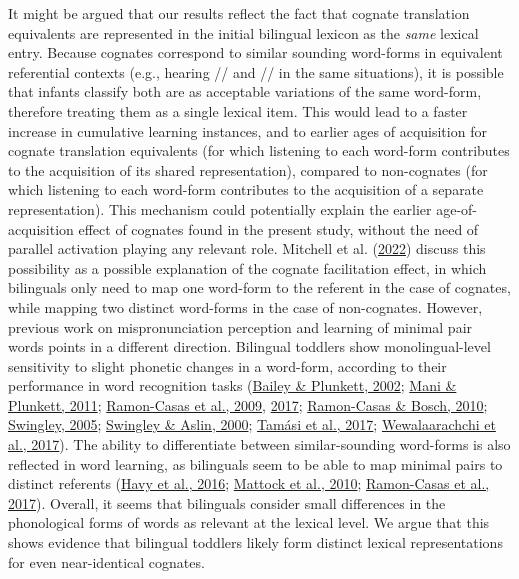 \documentclass[
]{article}
\begin{document}
It might be argued that our results reflect the fact that cognate
translation equivalents are represented in the initial bilingual lexicon
as the \emph{same} lexical entry. Because cognates correspond to similar
sounding word-forms in equivalent referential contexts (e.g., hearing
// and // in the same situations), it is
possible that infants classify both are as acceptable variations of the
same word-form, therefore treating them as a single lexical item. This
would lead to a faster increase in cumulative learning instances, and to
earlier ages of acquisition for cognate translation equivalents (for
which listening to each word-form contributes to the acquisition of its
shared representation), compared to non-cognates (for which listening to
each word-form contributes to the acquisition of a separate
representation). This mechanism could potentially explain the earlier
age-of-acquisition effect of cognates found in the present study,
without the need of parallel activation playing any relevant role.
Mitchell et al. (\protect\hyperlink{ref-mitchell2022cognates}{2022})
discuss this possibility as a possible explanation of the cognate
facilitation effect, in which bilinguals only need to map one word-form
to the referent in the case of cognates, while mapping two distinct
word-forms in the case of non-cognates. However, previous work on
mispronunciation perception and learning of minimal pair words points in
a different direction. Bilingual toddlers show monolingual-level
sensitivity to slight phonetic changes in a word-form, according to
their performance in word recognition tasks
(\protect\hyperlink{ref-bailey2002phonological}{Bailey \& Plunkett,
2002}; \protect\hyperlink{ref-mani2011does}{Mani \& Plunkett, 2011};
\protect\hyperlink{ref-ramon-casas2009vowel}{Ramon-Casas et al., 2009},
\protect\hyperlink{ref-ramon-casas2017minimalpair}{2017};
\protect\hyperlink{ref-ramon-casas2010are}{Ramon-Casas \& Bosch, 2010};
\protect\hyperlink{ref-swingley200511montholds}{Swingley, 2005};
\protect\hyperlink{ref-swingley2000spoken}{Swingley \& Aslin, 2000};
\protect\hyperlink{ref-tamasi2017pupillometry}{Tamási et al., 2017};
\protect\hyperlink{ref-wewalaarachchi2017vowels}{Wewalaarachchi et al.,
2017}). The ability to differentiate between similar-sounding word-forms
is also reflected in word learning, as bilinguals seem to be able to map
minimal pairs to distinct referents
(\protect\hyperlink{ref-havy2016phonetic}{Havy et al., 2016};
\protect\hyperlink{ref-mattock2010first}{Mattock et al., 2010};
\protect\hyperlink{ref-ramon-casas2017minimalpair}{Ramon-Casas et al.,
2017}). Overall, it seems that bilinguals consider small differences in
the phonological forms of words as relevant at the lexical level. We
argue that this shows evidence that bilingual toddlers likely form
distinct lexical representations for even near-identical cognates.
\end{document}
